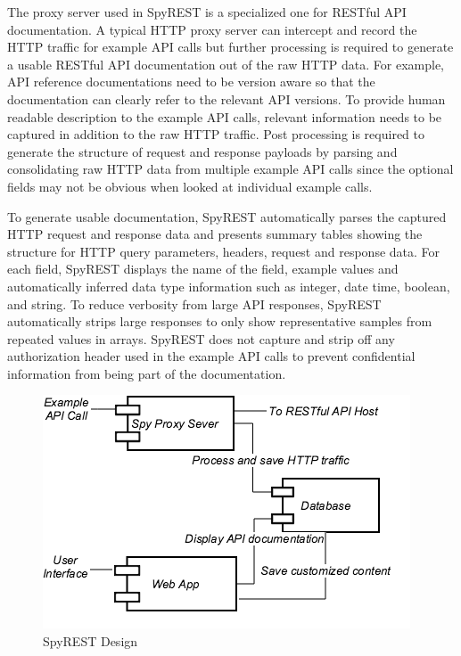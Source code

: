 \documentclass[conference]{IEEEtran}
\begin{document}
The proxy server used in SpyREST is a specialized one for RESTful API documentation. A typical HTTP proxy server can intercept and record the HTTP traffic for example API calls but further processing is required to generate a usable RESTful API documentation out of the raw HTTP data. For example, API reference documentations need to be version aware so that the documentation can clearly refer to the relevant API versions. To provide human readable description to the example API calls, relevant information needs to be captured in addition to the raw HTTP traffic. Post processing is required to generate the structure of request and response payloads by parsing and consolidating raw HTTP data from multiple example API calls since the optional fields may not be obvious when looked at individual example calls.

To generate usable documentation, SpyREST automatically parses the captured HTTP request and response data and presents summary tables showing the structure for HTTP query parameters, headers, request and response data. For each field, SpyREST displays the name of the field, example values and automatically inferred data type information such as integer, date time, boolean, and string. To reduce verbosity from large API responses, SpyREST automatically strips large responses to only show representative samples from repeated values in arrays. SpyREST does not capture and strip off any authorization header used in the example API calls to prevent confidential information from being part of the documentation.

\begin{figure}[tbh]
  \centering
  \includegraphics[width=\linewidth]{spyrest_components.png}
  \caption{SpyREST Design}
  \label{fig:components}
\end{figure}
\end{document}
